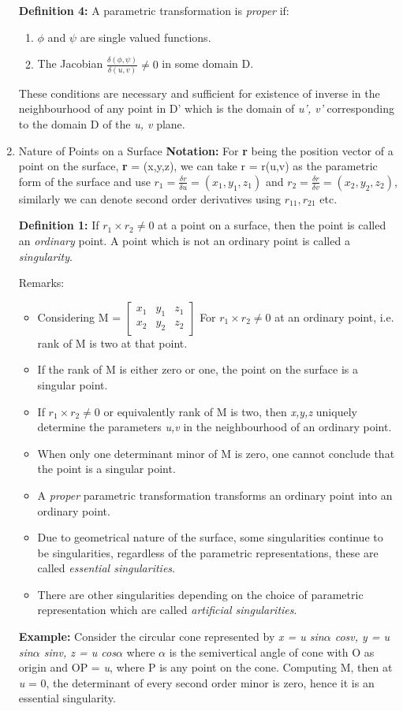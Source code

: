 \documentclass[11pt]{article}
\begin{document}
\begin{enumerate}
\textbf{Definition 4:} A parametric transformation is \emph{proper} if:
\begin{enumerate}
\item \(\phi\) and \(\psi\) are single valued functions.
\item The Jacobian \(\frac{\delta (\phi,\psi)}{\delta (u,v)}\neq0\) in some domain D.
\end{enumerate}
These conditions are necessary and sufficient for existence of inverse in the neighbourhood of any point in D' which is the domain of \emph{u', v'} corresponding to the domain D of the \emph{u, v} plane.
\item Nature of Points on a Surface
\label{sec:org290f64c}
\textbf{Notation:} For \textbf{r} being the position vector of a point on the surface, \textbf{r} = (x,y,z), we can take r = r(u,v) as the parametric form of the surface and use \(r_1 = \frac{\delta r}{\delta u} = (x_{1},y_{1},z_{1})\) and \(r_2 = \frac{\delta r}{\delta v} = (x_{2},y_{2},z_{2})\), similarly we can denote second order derivatives using \(r_{11}, r_{21}\) etc.

\textbf{Definition 1:} If \(r_{1}\times r_{2}\neq0\) at a point on a surface, then the point is called an \emph{ordinary} point. A point which is not an ordinary point is called a \emph{singularity}.

Remarks:
\begin{itemize}
\item Considering M = \(\begin{bmatrix} x_{1} & y_{1} & z_{1}\\
  x_{2} & y_{2} & z_{2}\end{bmatrix}\)
For \(r_{1} \times r_{2} \neq 0\) at an ordinary point, i.e. rank of M is two at that point.
\item If the rank of M is either zero or one, the point on the surface is a singular point.
\item If \(r_{1} \times r_{2}\neq0\) or equivalently rank of M is two, then \emph{x,y,z} uniquely determine the parameters \emph{u,v} in the neighbourhood of an ordinary point.
\item When only one determinant minor of M is zero, one cannot conclude that the point is a singular point.
\item A \emph{proper} parametric transformation transforms an ordinary point into an ordinary point.
\item Due to geometrical nature of the surface, some singularities continue to be singularities, regardless of the parametric representations, these are called \emph{essential singularities}.
\item There are other singularities depending on the choice of parametric representation which are called \emph{artificial singularities}.
\end{itemize}
\textbf{Example:} Consider the circular cone represented by \emph{x = u sin\(\alpha\) cosv, y = u sin\(\alpha\) sinv, z = u cos\(\alpha\)} where \(\alpha\) is the semivertical angle of cone with O as origin and OP = \emph{u}, where P is any point on the cone.
Computing M, then at \emph{u} = 0, the determinant of every second order minor is zero, hence it is an essential singularity.


\end{enumerate}
\end{document}
